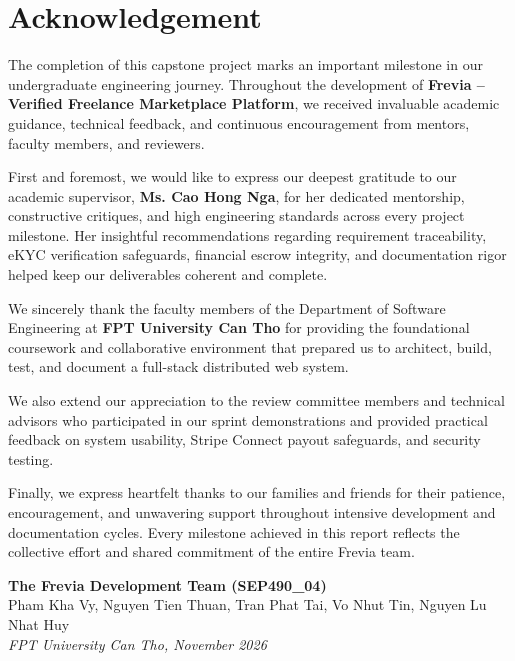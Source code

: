\section*{\fontsize{16}{19}\selectfont\bfseries\color{fptred} Acknowledgement}

The completion of this capstone project marks an important milestone in our undergraduate engineering journey. Throughout the development of \textbf{Frevia -- Verified Freelance Marketplace Platform}, we received invaluable academic guidance, technical feedback, and continuous encouragement from mentors, faculty members, and reviewers.

First and foremost, we would like to express our deepest gratitude to our academic supervisor, \textbf{Ms. Cao Hong Nga}, for her dedicated mentorship, constructive critiques, and high engineering standards across every project milestone. Her insightful recommendations regarding requirement traceability, eKYC verification safeguards, financial escrow integrity, and documentation rigor helped keep our deliverables coherent and complete.

We sincerely thank the faculty members of the Department of Software Engineering at \textbf{FPT University Can Tho} for providing the foundational coursework and collaborative environment that prepared us to architect, build, test, and document a full-stack distributed web system.

We also extend our appreciation to the review committee members and technical advisors who participated in our sprint demonstrations and provided practical feedback on system usability, Stripe Connect payout safeguards, and security testing.

Finally, we express heartfelt thanks to our families and friends for their patience, encouragement, and unwavering support throughout intensive development and documentation cycles. Every milestone achieved in this report reflects the collective effort and shared commitment of the entire Frevia team.

\bigskip
\begin{flushright}
    \textbf{The Frevia Development Team (SEP490\_04)}\\
    Pham Kha Vy, Nguyen Tien Thuan, Tran Phat Tai, Vo Nhut Tin, Nguyen Lu Nhat Huy\\
    \textit{FPT University Can Tho, November 2026}
\end{flushright}
\newpage
